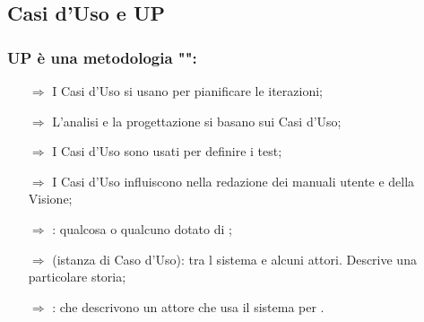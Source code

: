 \subsection{Casi d'Uso e UP}

\subsubsection{UP è una metodologia "":}
\begin{itemize}
    \item [$\Rightarrow$] I Casi d'Uso si usano per pianificare le iterazioni;
    \item [$\Rightarrow$] L'analisi e la progettazione si basano sui Casi d'Uso;
    \item [$\Rightarrow$] I Casi d'Uso sono usati per definire i test;
    \item [$\Rightarrow$] I Casi d'Uso influiscono nella redazione dei manuali utente e della Visione;
    \item [$\Rightarrow$] : qualcosa o qualcuno dotato di ;
    \item [$\Rightarrow$]  (istanza di Caso d'Uso):  tra l sistema e alcuni attori. Descrive una particolare storia;
    \item [$\Rightarrow$] :  che descrivono un attore che usa il sistema per .
\end{itemize}

\pagebreak
{}

